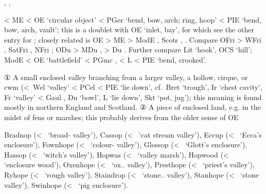 \documentclass[12pt,letterpaper,oneside,article,draft]{memoir}
\begin{document}
\begin{Lemma}
\begin{Also}
	, , 
\end{Also}
\begin{Etymology}
	< ME  < OE  ‘circular object’ < PGer  ‘bend, bow, arch; ring, hoop’
		< PIE  ‘bend, bow, arch, vault’; this is a doublet with OE  ‘inlet, bay’,
		for which see the other entry for ; closely related is OE  > ME 
		> ModE , Scots , .
	Compare
	OFri  > WFri , SatFri , NFri ;
	ODu  > MDu ,  > Du .
	Further compare Lit  ‘hook’, OCS   ‘hill’;
	ModE  < OE  ‘battlefield’ < PGmc , 
		< L  < PIE  ‘bend, crooked’.
\end{Etymology}
\begin{Definitions}
	① A small enclosed valley branching from a larger valley, a hollow, cirque,
		or cwm (<~Wel  ‘valley’ < PCel  < PIE  ‘lie down’,
		cf.\ Bret  ‘trough’, Ir  ‘chest cavity’, Fr  ‘valley’ < Gaul ,
		Du  ‘bowl’, L  ‘lie down’, Skt   ‘pot, jug’);
		this meaning is found mostly in northern England and Scotland.
	② A piece of enclosed land, e.g. in the midst of fens or marshes; this probably derives from the
		older sense of OE 
\end{Definitions}
\begin{Examples}
	Bradnop (<~ ‘broad- valley’), Cassop (<~ ‘cat stream valley’), Eccup (<~ ‘Ecca’s enclosure’), Fownhope (<~ ‘colour- valley’), Glossop (<~ ‘Glott’s enclosure’), Hassop (<~ ‘witch’s valley’), Hopwas (<~ ‘valley marsh’), Hopwood (<~ ‘enclosure wood’), Oxenhope (<~ ‘ox.. valley’), Presthope (<~ ‘priest’s valley’), Ryhope (<~ ‘rough valley’), Staindrop (<~ ‘stone.. valley’), Stanhope (<~ ‘stone valley’), Swinhope (<~ ‘pig enclosure’).
\end{Examples}
\end{Lemma}
\end{document}
